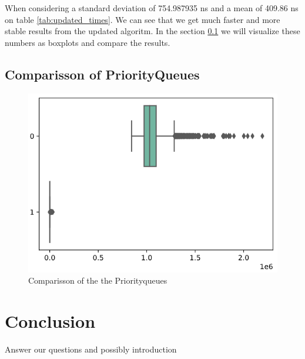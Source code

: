 \documentclass{article}
\begin{document}
When considering a standard deviation of 754.987935 ns and a mean of 409.86 ns on table \ref{tab:updated_times}.
We can see that we get much faster and more stable results from the updated algoritm. In the section
\ref{sec:comparisson_of_priorityqueues} we will
visualize these numbers as boxplots and compare the results.


\subsection{Comparisson of PriorityQueues} %
\label{sec:comparisson_of_priorityqueues}
\begin{figure}[h]
\label{img:boxplot_comparisson}
\includegraphics[width=\textwidth]{boxplot_comparisson}
\caption{Comparisson of the the Priorityqueues}
\end{figure}
\section{Conclusion} %
Answer our questions and possibly introduction



\end{document}
